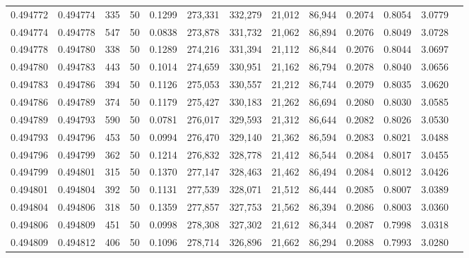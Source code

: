 \begin{tabular}{rrrrrrrrrrrrr}
0.494772 & 0.494774 &   335 &  50 &                                     0.1299 & 273,331 & 332,279 &  21,012 &  86,944 & 0.2074 & 0.8054 & 3.0779 \\
0.494774 & 0.494778 &   547 &  50 &                                     0.0838 & 273,878 & 331,732 &  21,062 &  86,894 & 0.2076 & 0.8049 & 3.0728 \\
0.494778 & 0.494780 &   338 &  50 &                                     0.1289 & 274,216 & 331,394 &  21,112 &  86,844 & 0.2076 & 0.8044 & 3.0697 \\
0.494780 & 0.494783 &   443 &  50 &                                     0.1014 & 274,659 & 330,951 &  21,162 &  86,794 & 0.2078 & 0.8040 & 3.0656 \\
0.494783 & 0.494786 &   394 &  50 &                                     0.1126 & 275,053 & 330,557 &  21,212 &  86,744 & 0.2079 & 0.8035 & 3.0620 \\
0.494786 & 0.494789 &   374 &  50 &                                     0.1179 & 275,427 & 330,183 &  21,262 &  86,694 & 0.2080 & 0.8030 & 3.0585 \\
0.494789 & 0.494793 &   590 &  50 &                                     0.0781 & 276,017 & 329,593 &  21,312 &  86,644 & 0.2082 & 0.8026 & 3.0530 \\
0.494793 & 0.494796 &   453 &  50 &                                     0.0994 & 276,470 & 329,140 &  21,362 &  86,594 & 0.2083 & 0.8021 & 3.0488 \\
0.494796 & 0.494799 &   362 &  50 &                                     0.1214 & 276,832 & 328,778 &  21,412 &  86,544 & 0.2084 & 0.8017 & 3.0455 \\
0.494799 & 0.494801 &   315 &  50 &                                     0.1370 & 277,147 & 328,463 &  21,462 &  86,494 & 0.2084 & 0.8012 & 3.0426 \\
0.494801 & 0.494804 &   392 &  50 &                                     0.1131 & 277,539 & 328,071 &  21,512 &  86,444 & 0.2085 & 0.8007 & 3.0389 \\
0.494804 & 0.494806 &   318 &  50 &                                     0.1359 & 277,857 & 327,753 &  21,562 &  86,394 & 0.2086 & 0.8003 & 3.0360 \\
0.494806 & 0.494809 &   451 &  50 &                                     0.0998 & 278,308 & 327,302 &  21,612 &  86,344 & 0.2087 & 0.7998 & 3.0318 \\
0.494809 & 0.494812 &   406 &  50 &                                     0.1096 & 278,714 & 326,896 &  21,662 &  86,294 & 0.2088 & 0.7993 & 3.0280 \\

\end{tabular}

